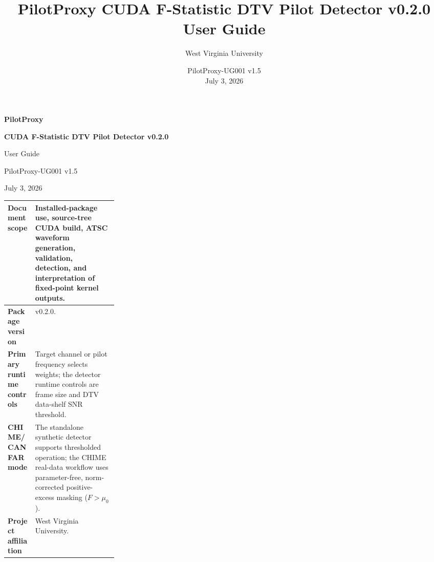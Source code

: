 \documentclass[10pt,letterpaper]{article}
\title{PilotProxy CUDA F-Statistic DTV Pilot Detector v0.2.0\\User Guide}
\author{West Virginia University}
\date{PilotProxy-UG001 v1.5 \\ July 3, 2026}
\newcommand{\code}[1]{\texttt{\detokenize{#1}}}
\begin{document}
\thispagestyle{empty}
\vspace*{0.25in}
{\fontsize{30}{32}\selectfont\bfseries\color{FStatRed}PilotProxy}\par
\vspace{0.12in}
{\fontsize{23}{26}\selectfont\bfseries CUDA F-Statistic DTV Pilot Detector v0.2.0}\par
\vspace{0.08in}
{\Large User Guide}\par
\vspace{0.35in}
{\large PilotProxy-UG001 v1.5}\par
{\large July 3, 2026}\par
\vfill
\begin{tabularx}{\linewidth}{|>{\bfseries}L{0.25\linewidth}|Y|}
\hline
Document scope & Installed-package use, source-tree CUDA build, ATSC waveform generation, validation, detection, and interpretation of fixed-point kernel outputs.\\ \hline
Package version & \code{pilot-proxy} v0.2.0.\\ \hline
Primary runtime controls & Target channel or pilot frequency selects weights; the detector runtime controls are frame size and DTV data-shelf SNR threshold.\\ \hline
CHIME/CANFAR mode & The standalone synthetic detector supports thresholded operation; the CHIME real-data workflow uses parameter-free, norm-corrected positive-excess masking ($F>\mu_0$).\\ \hline
Project affiliation & West Virginia University.\\ \hline
\end{tabularx}
\newpage
\end{document}
